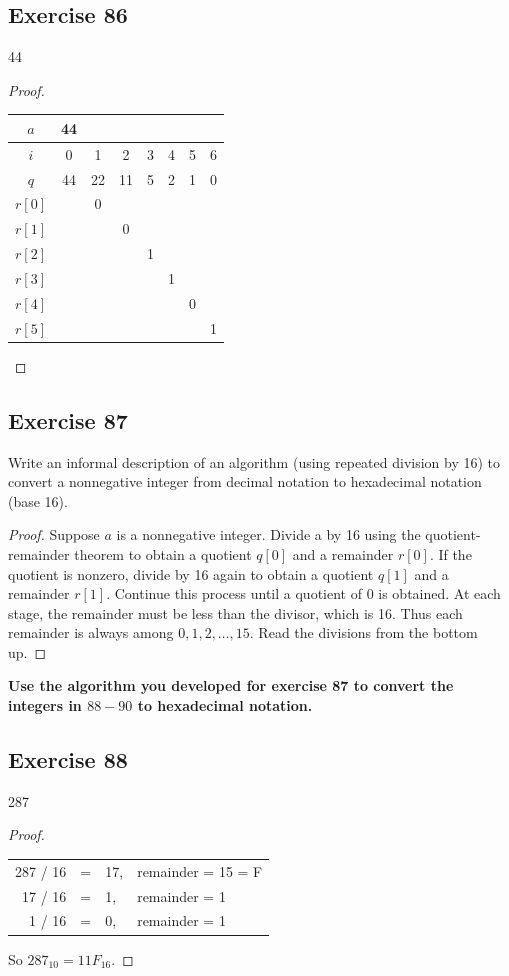 \documentclass[14pt]{extarticle}
\newcommand{\cy}{\color{cyan}}
\begin{document}
\subsection{Exercise 86}
44
\begin{proof}
\begin{center}
\begin{tabular}{|c|c|c|c|c|c|c|c|}
\hline
$a$&44&&&&&& \\
\hline
$i$&0&1&2&3&4&5&6 \\
\hline
$q$&44&22&11&5&2&1&0 \\
\hline
$r[0]$&&0&&&&& \\
\hline
$r[1]$&&&0&&&& \\
\hline
$r[2]$&&&&1&&& \\
\hline
$r[3]$&&&&&1&& \\
\hline
$r[4]$&&&&&&0& \\
\hline
$r[5]$&&&&&&&1 \\
\hline
\end{tabular}
\end{center}
\end{proof}

\subsection{Exercise 87}
Write an informal description of an algorithm (using repeated division by 16) to convert a nonnegative integer from decimal notation to hexadecimal notation (base 16).

\begin{proof}
Suppose $a$ is a nonnegative integer. Divide a by 16 using the quotient-remainder theorem to obtain a quotient $q[0]$ and a remainder $r[0]$. If the quotient is nonzero, divide by 16 again to obtain a quotient $q[1]$ and a remainder $r[1]$. Continue this process until a quotient of 0 is obtained. At each stage, the remainder must be less than the divisor, which is 16. Thus each remainder is always among $0, 1, 2, \ldots, 15$. Read the divisions from the bottom up.
\end{proof}

{\bf\cy Use the algorithm you developed for exercise 87 to convert the integers in $88-90$ to hexadecimal notation.}

\subsection{Exercise 88}
287
\begin{proof}
\begin{center}
\begin{tabular}{rcll}
287 / 16 & = & 17, & remainder = 15 = F \\
17 / 16 & = & 1, & remainder = 1 \\
1 / 16 & = & 0, & remainder = 1
\end{tabular}
\end{center}
So $287_{10} = 11F_{16}$.
\end{proof}
\end{document}
